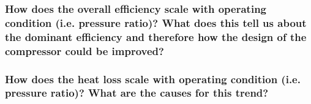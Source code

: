 \documentclass[class=article, crop=false, 12pt,a4paper]{standalone}
\numberwithin{equation}{section}
\begin{document}
\subsubsection{How does the overall efficiency scale with operating condition (i.e. pressure ratio)? What does this tell us about the dominant efficiency and therefore how the design of the compressor could be improved?} 
\subsubsection{How does the heat loss scale with operating condition (i.e. pressure ratio)? What are the causes for this trend?}
\listoffigures
\end{document}
